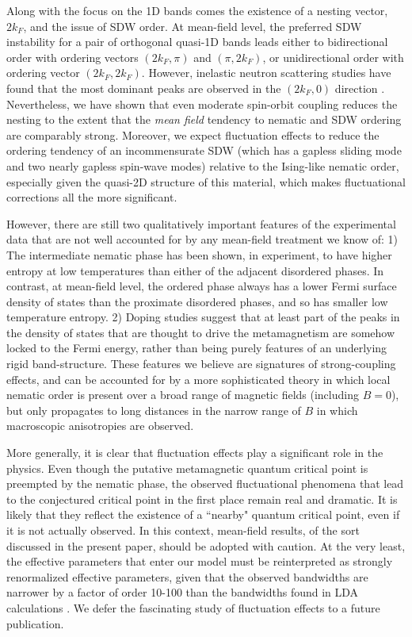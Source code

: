 \documentclass[prb,aps,amssymb,showpacs,twocolumn,amsmath,floatfix]{revtex4}
\begin{document}
Along with the focus on the 1D bands comes the existence of a nesting vector, $2k_F$, 
and the issue of SDW order.  At mean-field level, the preferred SDW instability for a pair of 
orthogonal quasi-1D bands leads \cite{Yao2006} either to bidirectional order with ordering vectors 
$(2k_F, \pi)$ and $(\pi, 2k_F)$, or unidirectional order with ordering vector $(2k_F, 2k_F)$.  
However, inelastic neutron scattering studies have found that the most dominant peaks are observed 
in the $(2 k_F, 0)$ direction \cite{Capogna2003}.  
Nevertheless, we have shown that even moderate spin-orbit coupling reduces the nesting to the extent that the {\it mean field} tendency to nematic 
and SDW ordering are comparably strong.  Moreover, we expect fluctuation effects to reduce the 
ordering tendency of an incommensurate SDW (which has a gapless sliding mode and two 
nearly gapless spin-wave modes) relative to the Ising-like nematic order, especially 
given the quasi-2D structure of this material, which makes fluctuational corrections all the more 
significant.  






However, there are still two qualitatively important features of the experimental data that are not well 
accounted for by any mean-field treatment we know of:  1)  The intermediate nematic phase has been 
shown, in experiment, to have higher entropy at low temperatures than either of the adjacent  disordered 
phases.  In contrast, at mean-field level, the ordered phase always has a lower Fermi surface density of 
states than the proximate disordered phases, and so has smaller low temperature entropy.  2)  
Doping studies suggest that at least part of the peaks in the density of states that are thought to drive the metamagnetism are somehow locked to the Fermi energy, rather than being purely features of an underlying rigid band-structure.
These features we believe are signatures of strong-coupling effects, and can be 
accounted for by a more sophisticated theory in which local nematic order is present over a broad range 
of magnetic fields (including $B=0$), but only propagates to long distances in the narrow range of $B$ 
in which macroscopic anisotropies are observed.  

More generally, it is clear that fluctuation effects play a significant role in the physics.  Even though the 
putative metamagnetic quantum critical point is preempted by the nematic phase, the 
observed fluctuational phenomena that lead to the conjectured critical point in the first place remain 
real and dramatic.  It is likely that they reflect the existence of a ``nearby" quantum critical point, 
even if it is not actually observed.  In this context, mean-field results, of the sort discussed in the present 
paper, should be adopted with caution.  At the very least, the effective parameters that enter 
our model must be reinterpreted as strongly renormalized effective parameters, given that the 
observed bandwidths  \cite{Reference} are narrower by a factor of order 10-100 than the bandwidths 
found in LDA calculations \cite{Singh2001}.  We defer the fascinating study of fluctuation effects 
to a future publication.    
\end{document}
